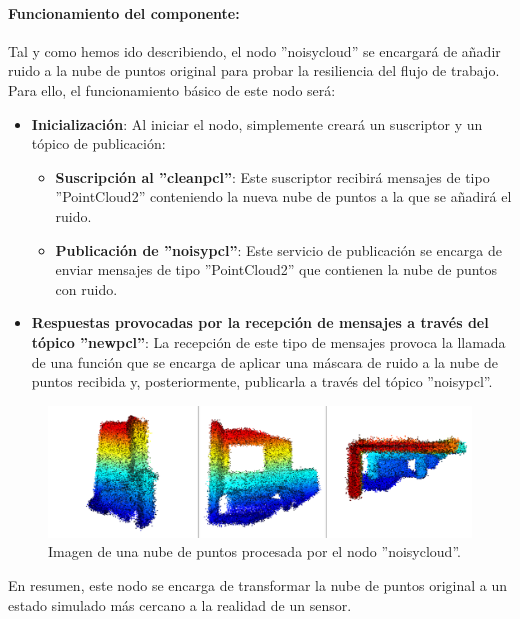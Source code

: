 \documentclass[12pt, a4paper, twoside]{article}
\begin{document}
\paragraph{Funcionamiento del componente:} 
Tal y como hemos ido describiendo, el nodo ''noisy\textunderscore cloud'' se encargará de añadir ruido a la nube de puntos original para probar la resiliencia 
del flujo de trabajo. Para ello, el funcionamiento básico de este nodo será:
\begin{itemize}
  \item \textbf{Inicialización}: Al iniciar el nodo, simplemente creará un suscriptor y un tópico de publicación:
  \begin{itemize}
    \item \textbf{Suscripción al ''clean\textunderscore pcl''}: Este suscriptor recibirá mensajes de tipo ''PointCloud2'' conteniendo la nueva nube de puntos
    a la que se añadirá el ruido.
    \item \textbf{Publicación de ''noisy\textunderscore pcl''}: Este servicio de publicación se encarga de enviar mensajes de tipo ''PointCloud2'' que 
    contienen la nube de puntos con ruido. 
  \end{itemize}
  \item \textbf{Respuestas provocadas por la recepción de mensajes a través del tópico ''new\textunderscore pcl''}: La recepción de este tipo de mensajes 
  provoca la llamada de una función que se encarga de aplicar una máscara de ruido a la nube de puntos recibida y, posteriormente, publicarla a través del 
  tópico ''noisy\textunderscore pcl''.
\end{itemize}

\begin{figure}[h]
  \centering
    \includegraphics[width=1\textwidth]{noisy_pcl.png}
  \caption{Imagen de una nube de puntos procesada por el nodo ''noisy\textunderscore cloud''.}
\end{figure}

En resumen, este nodo se encarga de transformar la nube de puntos original a un estado simulado más cercano a la realidad de un sensor.
\end{document}
